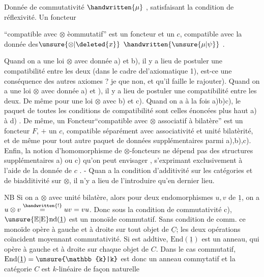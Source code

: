 
 Donnée de commutativité $\handwritten{\mu}$ , satisfaisant la condition de réflexivité.\deleted{(} Un foncteur


``compatible avec $\otimes$ èommutatif'' est un foncteur et un $c$, compatible avec la donnée des$\unsure{\otimes|\deleted{x}}$ $\handwritten{\unsure{\mu|\psi}}$ .

Quand on a une loi $\otimes$ avec donnée a) et b), il y a lieu de postuler une compatibilité entre les deux (dans le cadre del'axiomatique 1), est-ce une conséquence des autres axiomes ? je  que non, et qu'il faille le rajouter). Quand on a une loi $\otimes$ avec donnée a) et ), il y a lieu de postuler une compatibilité entre les deux. De même pour une loi $\otimes$ avec b) et c). Quand on a à la fois a)b)c), le paquet  de toutes les conditions de compatibilité sont celles énoncées plus haut  a) à d) . De même, un Foncteur``compatible avec $\otimes$ associatif à  bilatère'' est un foncteur $F$, $+$ un $c$, compatible séparément avec associativité et unité bilatèrité, et de même pour tout autre paquet de données supplémentaires parmi a),b),c). Enfin, la notion d'homomorphisme de  $\otimes$-foncteurs ne dépend pas des structures supplémentaires a) ou c) qu'on peut envisager , s'exprimant exclusivement à l'aide de la donnée de $c$\deleted{\unsure{)}} . - Quan a la  condition d'additivité sur les catégories et de biadditivité sur $\otimes$, il n'y a lieu de l'introduire qu'en dernier lieu.

 NB Si on a $\otimes$ avec unité bilatère, alors pour deux endomorphismes $u,v$ de $\underline{1}$, on a $u\otimes v\overset{\handwritten{!}}{=}uv=vu$. Donc sous la condition de commutativité c), $\unsure{\mathbb{E}|\mathrm{E}}\mathrm{nd}(\underline{1})$ est un monoïde commutatif.  Sans condition de comm. ce monoïde opère à gauche et à droite sur tout objet de $\underline{C}$; les deux opérations coïncident moyennant commutativité. Si  est addtive, $\mathrm{End}(\underline{1})$ est un anneau, qui opère à gauche et à droite sur chaque objet de $C$. Dans le cas commutatif, $\mathrm{End}(\underline{1})=\unsure{\mathbb{k}|k}$ est donc un anneau commytatif et la catégorie $C$ est $k$-linéaire de façon naturelle

